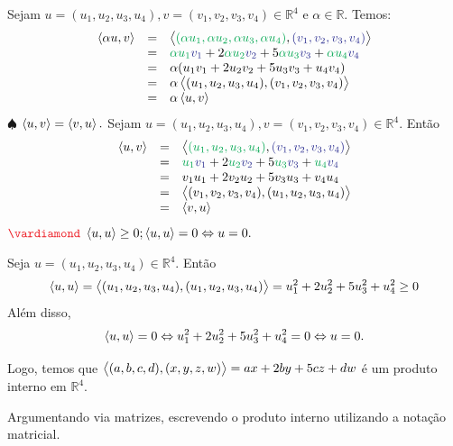 \documentclass[11pt,a4paper]{article}
\begin{document}
{\begin{itemize}
{Sejam $u = (u_1, u_2, u_3, u_4), v = (v_1, v_2, v_3, v_4) \in \mathbb{R}^4$ e $\alpha \in \mathbb{R}.$ Temos:
\[
\begin{array}{rcl}
\prin{\alpha u, v} &=& \prin{\textcolor{Green}{(\alpha u_1, \alpha u_2, \alpha u_3, \alpha u_4)}, \textcolor{Blue}{(v_1,v_2, v_3, v_4)}} \\
&=&\textcolor{Green}{\alpha u_1} \textcolor{Blue}{v_1} + 2\textcolor{Green}{\alpha u_2} \textcolor{Blue}{v_2} + 5\textcolor{Green}{\alpha u_3} \textcolor{Blue}{v_3} + \textcolor{Green}{\alpha u_4} \textcolor{Blue}{v_4} \\ &=& \alpha (u_1v_1+ 2u_2v_2+5u_3v_3+ u_4v_4) \\ &=& \alpha \prin{(u_1,u_2, u_3, u_4), (v_1,v_2, v_3, v_4)} \\ &=& \alpha \prin{u,v}
\end{array}
\]
\newline
$\spadesuit$ $\left\langle u,v \right\rangle = \left\langle v,u \right\rangle.$
Sejam $u = (u_1, u_2, u_3, u_4), v = (v_1, v_2, v_3, v_4) \in \mathbb{R}^4.$ Então
\[
\begin{array}{rcl}
\prin{u,v} &=& \prin{\textcolor{Green}{(u_1, u_2, u_3, u_4)}, \textcolor{Blue}{(v_1, v_2, v_3, v_4)} } \\
&=&\textcolor{Green}{u_1} \textcolor{Blue}{v_1} + 2\textcolor{Green}{ u_2} \textcolor{Blue}{v_2} + 5\textcolor{Green}{ u_3} \textcolor{Blue}{v_3} + \textcolor{Green}{ u_4} \textcolor{Blue}{v_4} \\
&=& v_1u_1 + 2v_2u_2 + 5v_3u_3 + v_4u_4 \\
&=& \prin{(v_1, v_2, v_3, v_4),(u_1, u_2, u_3, u_4)} \\
&=& \prin{v,u}
\end{array}
\]
\newline
$\textcolor{Red}{\vardiamond}$ $\left\langle u,u \right\rangle \ge 0; \left\langle u,u \right\rangle = 0 \Leftrightarrow u = 0.$ 

Seja $u = (u_1, u_2, u_3, u_4) \in \mathbb{R}^4.$ Então
\[
\left\langle u,u \right\rangle = \left\langle (u_1, u_2, u_3, u_4),(u_1, u_2, u_3, u_4) \right\rangle = u_1^2 +2u_2^2 + 5u_3^2 + u_4^2 \ge 0
\]
Além disso, 
\[
\left\langle u,u \right\rangle = 0 \Leftrightarrow u_1^2 +2u_2^2 + 5u_3^2 + u_4^2 = 0 \Leftrightarrow u = 0.
\]

Logo, temos que $\left\langle (a,b,c,d), (x,y,z,w) \right\rangle = ax + 2by + 5cz + dw$ é um produto interno em $\mathbb{R}^4.$

    \task[\pers{b}]
    
    
    \item Argumentando via matrizes, escrevendo o produto interno utilizando a notação matricial. 
    
}
\end{itemize}}
\end{document}
